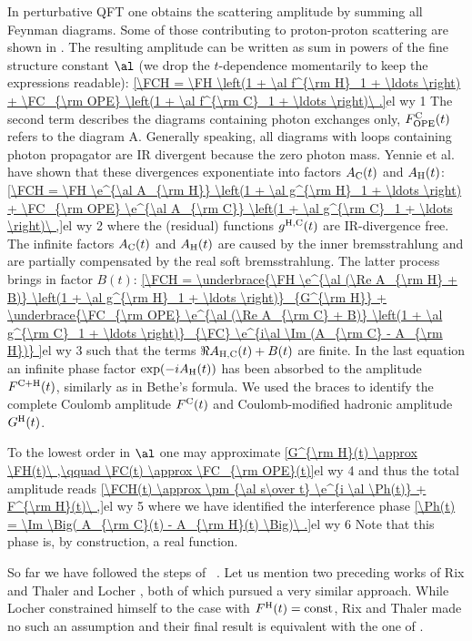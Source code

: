 In perturbative QFT one obtains the scattering amplitude by summing all Feynman diagrams. Some of those contributing to proton-proton scattering are shown in . The resulting amplitude can be written as sum in powers of the fine structure constant $\al$ (we drop the $t$-dependence momentarily to keep the expressions readable):
\eqref{\FCH = \FH \left(1 + \al f^{\rm H}_1 + \ldots \right) + \FC_{\rm OPE} \left(1 + \al f^{\rm C}_1 + \ldots \right)\ .}{el wy 1}
The second term describes the diagrams containing photon exchanges only, $F^{\rm C}_{\rm OPE}(t)$ refers to the diagram  A. Generally speaking, all diagrams with loops containing photon propagator are IR divergent because the zero photon mass. Yennie et al.  have shown that these divergences exponentiate into factors $A_{\rm C}(t)$ and $A_{\rm H}(t)$:
\eqref{\FCH = \FH \e^{\al A_{\rm H}} \left(1 + \al g^{\rm H}_1 + \ldots \right) + \FC_{\rm OPE} \e^{\al A_{\rm C}} \left(1 + \al g^{\rm C}_1 + \ldots \right)\ ,}{el wy 2}
where the (residual) functions $g^{\rm H, C}(t)$ are IR-divergence free. The infinite factors $A_{\rm C}(t)$ and $A_{\rm H}(t)$ are caused by the inner bremsstrahlung and are partially compensated by the real soft bremsstrahlung. The latter process brings in factor $B(t)$:
\eqref{\FCH =
\underbrace{\FH \e^{\al (\Re A_{\rm H} + B)} \left(1 + \al g^{\rm H}_1 + \ldots \right)}_{G^{\rm H}}
+
\underbrace{\FC_{\rm OPE} \e^{\al (\Re A_{\rm C} + B)} \left(1 + \al g^{\rm C}_1 + \ldots \right)}_{\FC}
\e^{i\al \Im (A_{\rm C} - A_{\rm H})}
}{el wy 3}
such that the terms $\Re A_{\rm H, C}(t) + B(t)$ are finite. In the last equation an infinite phase factor $\exp(-iA_{\rm H}(t))$ has been absorbed to the amplitude $F^{\rm C+H}(t)$, similarly as in Bethe's formula. We used the braces to identify the complete Coulomb amplitude $F^{\rm C}(t)$ and Coulomb-modified hadronic amplitude $G^{\rm H}(t)$.

To the lowest order in $\al$ one may approximate
\eqref{G^{\rm H}(t) \approx \FH(t)\ ,\qquad \FC(t) \approx \FC_{\rm OPE}(t)}{el wy 4}
and thus the total amplitude reads
\eqref{\FCH(t) \approx \pm {\al s\over t} \e^{i \al \Ph(t)} + F^{\rm H}(t)\ ,}{el wy 5}
where we have identified the interference phase
\eqref{\Ph(t) = \Im \Big( A_{\rm C}(t) - A_{\rm H}(t) \Big)\ .}{el wy 6}
Note that this phase is, by construction, a real function.

So far we have followed the steps of \WaY\ . Let us mention two preceding works of Rix and Thaler  and Locher , both of which pursued a very similar approach. While Locher constrained himself to the case with $F^{\rm H}(t) = \hbox{const}$, Rix and Thaler made no such an assumption and their final result is equivalent with the one of \WY.

